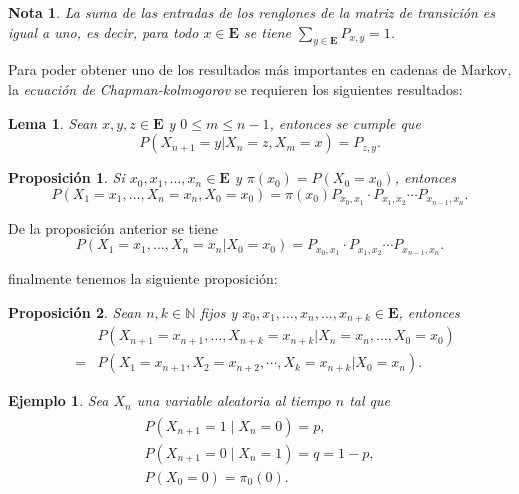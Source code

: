 \documentclass{article}
\newtheorem{Ejem}{Ejemplo}[section]
\newtheorem{Note}{Nota}%
\newtheorem{Prop}{Proposición}%
\newtheorem{Lema}{Lema}%
\newcommand{\nat}{\mathbb{N}}
\newcommand{\Eb}{\mathbf{E}}
\numberwithin{equation}{section}
\begin{document}
\begin{Note}
La suma de las entradas de los renglones de la matriz de transici\'on es igual a uno, es decir, para todo $x\in \mathbf{E}$ se tiene $\sum_{y\in\mathbf{E}}P_{x,y}=1$.
\end{Note}

Para poder obtener uno de los resultados m\'as importantes en cadenas de Markov, la \textit{ecuaci\'on de Chapman-kolmogorov} se requieren los siguientes resultados:

\begin{Lema}
Sean $x,y,z\in\Eb$ y $0\leq m\leq n-1$, entonces se cumple que
\begin{equation}
P\left(X_{n+1}=y|X_{n}=z,X_{m}=x\right)=P_{z,y}.
\end{equation}
\end{Lema}


\begin{Prop}
Si $x_{0},x_{1},\ldots,x_{n}\in \Eb$ y $\pi\left(x_{0}\right)=P\left(X_{0}=x_{0}\right)$, entonces
\begin{equation}
P\left(X_{1}=x_{1},\ldots,X_{n}=x_{n},X_{0}=x_{0}\right)=\pi\left(x_{0}\right)P_{x_{0},x_{1}}\cdot P_{x_{1},x_{2}}\cdots P_{x_{n-1},x_{n}}.
\end{equation}
\end{Prop}

De la proposici\'on anterior se tiene
\begin{equation}
P\left(X_{1}=x_{1},\ldots,X_{n}=x_{n}|X_{0}=x_{0}\right)=P_{x_{0},x_{1}}\cdot P_{x_{1},x_{2}}\cdots P_{x_{n-1},x_{n}}.
\end{equation}

finalmente tenemos la siguiente proposici\'on:

\begin{Prop}
Sean $n,k\in\nat$ fijos y $x_{0},x_{1},\ldots,x_{n},\ldots,x_{n+k}\in\Eb$, entonces
\begin{eqnarray*}
&&P\left(X_{n+1}=x_{n+1},\ldots,X_{n+k}=x_{n+k}|X_{n}=x_{n},\ldots,X_{0}=x_{0}\right)\\
&=&P\left(X_{1}=x_{n+1},X_{2}=x_{n+2},\cdots,X_{k}=x_{n+k}|X_{0}=x_{n}\right).
\end{eqnarray*}
\end{Prop}


\begin{Ejem}
Sea $X_{n}$ una variable aleatoria al tiempo $n$ tal que
\begin{eqnarray}
\begin{array}{l}
P\left(X_{n+1}=1 \mid X_{n}=0\right)=p,\\
P\left(X_{n+1}=0 \mid X_{n}=1\right)=q=1-p,\\
P\left(X_{0}=0\right)=\pi_{0}\left(0\right).
\end{array}
\end{eqnarray}

\end{Ejem}
\end{document}

